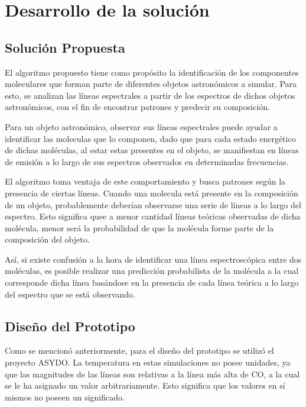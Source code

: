 \section{Desarrollo de la solución}

\subsection{Solución Propuesta}

El algoritmo propuesto tiene como propósito la identificación de los componentes moleculares que forman parte de diferentes objetos astronómicos a simular. Para esto, se analizan las líneas  espectrales a partir de los espectros de dichos objetos astronómicos, con el fin de encontrar patrones y predecir su composición.

Para un objeto astronómico, observar sus líneas espectrales puede ayudar a identificar las moleculas que lo componen, dado que para cada estado energético de dichas moléculas, al estar estas presentes en el objeto, se manifiestan en líneas de emisión a lo largo de sus espectros observados en determinadas frecuencias.

El algoritmo toma ventaja de este comportamiento y busca patrones según la presencia de ciertas líneas. Cuando una molecula está presente en la composición de un objeto, probablemente deberían observarse una serie de líneas a lo largo del espectro. Esto significa quee a menor cantidad líneas teóricas observadas de dicha molécula, menor será la probabilidad de que la molécula forme parte de la composición del objeto.

Así, si existe confusión a la hora de identificar una línea espectroscópica entre dos moléculas, es posible realizar una predicción probabilista de la molécula a la cual corresponde dicha línea basándose en la presencia de cada línea teórica a lo largo del espectro que se está observando.


\subsection{Diseño del Prototipo}

Como se mencionó anteriormente, para el diseño del prototipo se utilizó el proyecto ASYDO. La temperatura en estas simulaciones no posee unidades, ya que las magnitudes de las líneas son relativas a la línea más alta de CO, a la cual se le ha asignado un valor arbitrariamente. Esto significa que los valores en sí mismos no poseen un significado.

